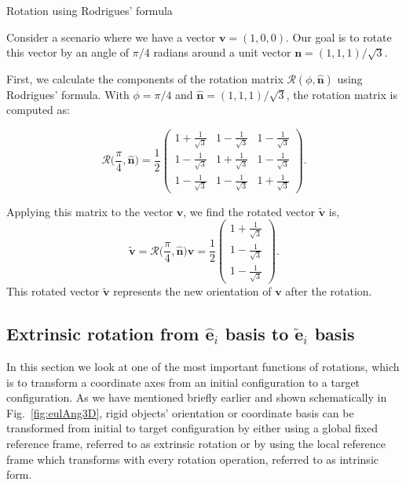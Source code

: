 \documentclass{article}
\def\nh{\hat{\mathbf{n}}}
\def\eh{\hat{\mathbf{e}}}
\def\et{\tilde{\mathbf{e}}}
\def\vt{\tilde{\mathbf{v}}}
\def\R{\mathcal{R}}
\def\nh{\hat{\mathbf{n}}}
\begin{document}
\begin{egsBox}[label={egs:rot3Dex1}, float, floatplacement=t]{Rotation using Rodrigues' formula}
  
    \footnotesize
    Consider a scenario where we have a vector $\mathbf{v} = (1, 0, 0)$. Our goal is to rotate this vector by an angle of $\pi/4$ radians around a unit vector $\mathbf{n} = (1, 1, 1)/{\sqrt{3}}$.

    First, we calculate the components of the rotation matrix $\R(\phi, \nh)$ using Rodrigues' formula. With $\phi = {\pi}/{4}$ and $\nh = (1, 1, 1)/{\sqrt{3}}$, the rotation matrix is computed as:

    \[
    \R \Big( \frac{\pi}{4}, \nh \Big) = \frac{1}{2} \begin{pmatrix}
        1+\frac{1}{\sqrt{3}} & 1-\frac{1}{\sqrt{3}} & 1-\frac{1}{\sqrt{3}} \\
        1-\frac{1}{\sqrt{3}} & 1+\frac{1}{\sqrt{3}} & 1-\frac{1}{\sqrt{3}} \\
        1-\frac{1}{\sqrt{3}} & 1-\frac{1}{\sqrt{3}} & 1+\frac{1}{\sqrt{3}}
    \end{pmatrix}.
    \]

    Applying this matrix to the vector $\mathbf{v}$, we find the rotated vector $\vt$ is,
    \[
    \vt = \R \Big( \frac{\pi}{4}, \nh \Big) \mathbf{v} = \frac{1}{2} \begin{pmatrix}
        1+\frac{1}{\sqrt{3}} \\
        1-\frac{1}{\sqrt{3}} \\
        1-\frac{1}{\sqrt{3}}
    \end{pmatrix}.
    \]
    This rotated vector $\vt$ represents the new orientation of $\mathbf{v}$ after the rotation.
\end{egsBox}

\subsection{Extrinsic rotation from \texorpdfstring{$\eh_i$}{ehi} basis to \texorpdfstring{$\et_i$}{eti} basis}\label{sec:ex2int}
In this section we look at one of the most important functions of rotations, which is to transform a coordinate axes from an initial configuration to a target configuration. As we have mentioned briefly earlier and shown schematically in Fig.~\ref{fig:eulAng3D}, rigid objects' orientation or coordinate basis can be transformed from initial to target configuration by either using a global fixed reference frame, referred to as extrinsic rotation or by using the local reference frame which transforms with every rotation operation, referred to as intrinsic form.
\end{document}
